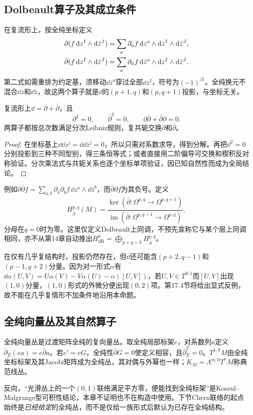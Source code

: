 \subsection{Dolbeault算子及其成立条件}
在复流形上，按全纯坐标定义
\begin{align}
 \partial(f\,\dd z^I\wedge\dd\bar z^J)
 &=\sum_a\partial_a f\,\dd z^a\wedge\dd z^I\wedge\dd\bar z^J,\notag\\
 \bar\partial(f\,\dd z^I\wedge\dd\bar z^J)
 &=\sum_a\partial_{\bar a}f\,\dd\bar z^a\wedge\dd z^I\wedge\dd\bar z^J.
 \label{eq:dolbeault-local}
\end{align}
第二式如需重排为约定基，须移动$\dd\bar z^a$穿过全部$\dd z^I$，符号为$(-1)^{|I|}$。全纯换元不混合$\dd z$和$\dd\bar z$，故这两个算子就是$\dd$的$(p+1,q)$和$(p,q+1)$投影，与坐标无关。

\begin{proposition}\label{prop:dolbeault-complex}
复流形上$\dd=\partial+\bar\partial$，且
\[
 \partial^2=0,\qquad\bar\partial^2=0,\qquad
 \partial\bar\partial+\bar\partial\partial=0.
\]
两算子都按总次数满足分次Leibniz规则，复共轭交换$\partial$和$\bar\partial$。
\end{proposition}
\begin{proof}
在坐标基上$\dd\dd z^j=\dd\dd\bar z^j=0$，所以只需对系数求导，得到分解。再把$\dd^2=0$分别投影到三种不同型别，得三条恒等式；或者直接用二阶偏导可交换和楔积反对称验证。分次乘法式与共轭关系也逐个坐标单项验证，因已知自然性而成为全局结论。
\end{proof}
例如$\partial\bar\partial f=\sum_{a,b}\partial_a\partial_{\bar b}f\,\dd z^a\wedge\dd\bar z^b$，而$\bar\partial\partial f$为其负号。定义
\[
 H^{p,q}_{\bar\partial}(M)=
 \frac{\ker(\bar\partial:\Omega^{p,q}\to\Omega^{p,q+1})}
 {\operatorname{im}(\bar\partial:\Omega^{p,q-1}\to\Omega^{p,q})},
\]
分母在$q=0$时为零。这里仅定义Dolbeault上同调，不预先宣称它与某个层上同调相同，亦不从第14章自动推出$H^k_{\mathrm{dR}}=\bigoplus_{p+q=k}H^{p,q}_{\bar\partial}$。

在仅有几乎复结构时，投影仍然存在，但$\dd$还可能含$(p+2,q-1)$和$(p-1,q+2)$分量。因为对一形式$\alpha$有$\dd\alpha(U,V)=U\alpha(V)-V\alpha(U)-\alpha([U,V])$，若$U,V\in T^{0,1}$而$[U,V]$出现$(1,0)$分量，$(1,0)$形式的外微分便出现$(0,2)$项。第17.4节将给出显式反例，故不能在几乎复情形不加条件地沿用本命题。

\subsection{全纯向量丛及其自然算子}
全纯向量丛是过渡矩阵全纯的复向量丛。取全纯局部标架$e$，对系数列$a$定义$\bar\partial_E(ea)=e\bar\partial a$。若$e'=eG$，全纯性$\bar\partial G=0$使定义相容，且$\bar\partial_E^2=0$。$T^{1,0}M$由全纯坐标标架及其Jacobi矩阵成为全纯丛，其对偶与外幂也一样；$K_M=\Lambda^{m,0}T^*M$称典范线丛。

反向，“光滑丛上的一个$(0,1)$联络满足平方零，便能找到全纯标架”是Koszul--Malgrange型可积性结论，本章不证明也不在构造中使用。下节Chern联络的起点始终是\emph{已经给定}的全纯丛，而不是仅给一族形式后默认为已存在全纯结构。
